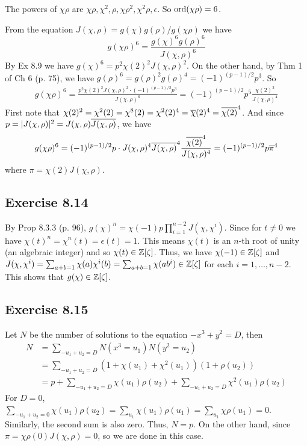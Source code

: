 \documentclass[../I&R.tex]{subfiles}
\begin{document}
The powers of $\chi\rho$ are $\chi\rho,\chi^2,\rho,\chi\rho^2,\chi^2\rho,\epsilon$. So $\operatorname{ord}(\chi\rho)=6$.

From the equation $J(\chi,\rho)=g(\chi)g(\rho)/g(\chi\rho)$ we have $$g(\chi\rho)^6=\frac{g(\chi)^6g(\rho)^6}{J(\chi,\rho)^6}$$ By Ex 8.9 we have $g(\chi)^6=p^2\chi(2)^2J(\chi,\rho)^2$. On the other hand, by Thm 1 of Ch 6 (p. 75), we have $g(\rho)^6=g(\rho)^2g(\rho)^4=(-1)^{(p-1)/2}p^3$. So
\begin{align*}
g(\chi\rho)^6 = \frac{p^2\chi(2)^2J(\chi,\rho)^2\cdot(-1)^{(p-1)/2}p^3}{J(\chi,\rho)^6} = (-1)^{(p-1)/2}p^5\frac{\chi(2)^2}{J(\chi,\rho)^4}
\end{align*}
First note that $\chi(2)^2=\chi^2(2)=\chi^8(2)=\chi^2(2)^4=\overline{\chi}(2)^4=\overline{\chi(2)}^4$. And since $p=|J(\chi,\rho)|^2=J(\chi,\rho)\overline{J(\chi,\rho)}$, we have
\begin{align*}
g(\chi\rho)^6 = (-1)^{(p-1)/2}p\cdot J(\chi,\rho)^4\overline{J(\chi,\rho)}^4\frac{\overline{\chi(2)}^4}{J(\chi,\rho)^4} = (-1)^{(p-1)/2}p\overline{\pi}^4
\end{align*}
where $\pi=\chi(2)J(\chi,\rho)$.

\subsection*{Exercise 8.14}

By Prop 8.3.3 (p. 96), $g(\chi)^n=\chi(-1)p\prod_{i=1}^{n-2} J(\chi,\chi^i)$. Since for $t\neq0$ we have $\chi(t)^n=\chi^n(t)=\epsilon(t)=1$. This means $\chi(t)$ is an $n$-th root of unity (an algebraic integer) and so $\chi(t)\in\mathbb{Z}[\zeta]$. Thus, we have $\chi(-1)\in\mathbb{Z}[\zeta]$ and $J(\chi,\chi^i)=\sum_{a+b=1} \chi(a)\chi^i(b)=\sum_{a+b=1} \chi(ab^i)\in\mathbb{Z}[\zeta]$ for each $i=1,\ldots,n-2$. This shows that $g(\chi)\in\mathbb{Z}[\zeta]$.

\subsection*{Exercise 8.15}

Let $N$ be the number of solutions to the equation $-x^3+y^2=D$, then 
\begin{align*}
N &= \sum_{-u_1+u_2=D} N(x^3=u_1)N(y^2=u_2) \\
&= \sum_{-u_1+u_2=D} (1+\chi(u_1)+\chi^2(u_1))(1+\rho(u_2)) \\
&= p + \sum_{-u_1+u_2=D} \chi(u_1)\rho(u_2) + \sum_{-u_1+u_2=D} \chi^2(u_1)\rho(u_2)
\end{align*}
For $D=0$, $\sum_{-u_1+u_2=0} \chi(u_1)\rho(u_2) = \sum_{u_1} \chi(u_1)\rho(u_1) = \sum_{u_1} \chi\rho(u_1) = 0$. Similarly, the second sum is also zero. Thus, $N=p$. On the other hand, since $\pi=\chi\rho(0)J(\chi,\rho)=0$, so we are done in this case.
\end{document}
